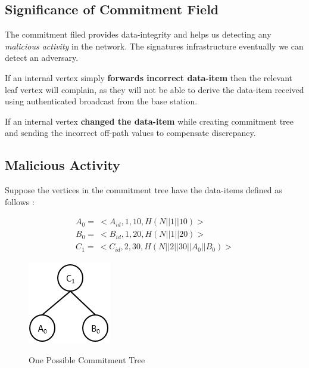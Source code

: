 \documentclass[%
  slidesonly,%
  semlayer%
  ]{seminar}                                  %
\begin{document}
\begin{slide}
    \subsection*{Significance of Commitment Field}

        The commitment filed provides data-integrity and helps us detecting any \textit{malicious activity} in the network. 
        The signatures infrastructure eventually we can detect an adversary. 

        If an internal vertex simply \textbf{forwards incorrect data-item} then the relevant leaf vertex will complain, as they will not be able to derive the data-item received using authenticated broadcast from the base station.
        
        If an internal vertex \textbf{changed the data-item} while creating commitment tree and sending the incorrect off-path values to compensate discrepancy. 
        \vfill
        \clearpage

    \subsection*{Malicious Activity}

        Suppose the vertices in the commitment tree have the data-items defined as follows :
        
        \begin{equation*}
          \begin{array}{l}
            A_{0} =\ <A_{id},1,10, H(N||1||10)>\\
            B_{0} =\ <B_{id},1,20, H(N||1||20)>\\
            C_{1} =\ <C_{id},2,30, H(N||2||30||A_{0}||B_{0})>
          \end{array}
        \end{equation*}

        \begin{figure}
          \centering
          \includegraphics[scale=0.6]{images/commitment-tree-2.png}
          \label{fig:smallest-ct}
          \tiny{\caption{One Possible Commitment Tree}}
        \end{figure}
        \vfill
        \clearpage


\end{slide}
\end{document}

